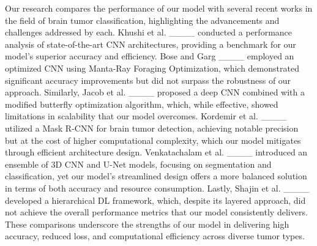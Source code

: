 Our research compares the performance of our model with several recent works in the field of brain tumor classification, highlighting the advancements and challenges addressed by each. Khushi et al. ____ conducted a performance analysis of state-of-the-art CNN architectures, providing a benchmark for our model’s superior accuracy and efficiency. Bose and Garg ____ employed an optimized CNN using Manta-Ray Foraging Optimization, which demonstrated significant accuracy improvements but did not surpass the robustness of our approach. Similarly, Jacob et al. ____ proposed a deep CNN combined with a modified butterfly optimization algorithm, which, while effective, showed limitations in scalability that our model overcomes. Kordemir et al. ____ utilized a Mask R-CNN for brain tumor detection, achieving notable precision but at the cost of higher computational complexity, which our model mitigates through efficient architecture design. Venkatachalam et al. ____ introduced an ensemble of 3D CNN and U-Net models, focusing on segmentation and classification, yet our model’s streamlined design offers a more balanced solution in terms of both accuracy and resource consumption. Lastly, Shajin et al. ____ developed a hierarchical DL framework, which, despite its layered approach, did not achieve the overall performance metrics that our model consistently delivers. These comparisons underscore the strengths of our model in delivering high accuracy, reduced loss, and computational efficiency across diverse tumor types.
